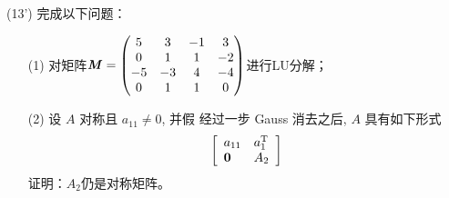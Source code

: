 \documentclass[12pt,a4paper,openany,twoside]{ctexbook}
\begin{document}
\begin{exercise}(13')
	完成以下问题：
	
	\begin{itemize}
		\item [(1)]  对矩阵$\boldsymbol{\mathit{M}} = \begin{pmatrix}
			5& 3& -1&  3\\
			0& 1&  1& -2\\
			-5& -3&  4& -4\\
			0&  1&  1&  0\\
		\end{pmatrix}$进行LU分解；
		\item [(2)] 设 $A$ 对称且 $a_{11} \neq 0$, 并假 经过一步 Gauss 消去之后, $A$ 具有如下形式
		$$
		\left[\begin{array}{ll}
			a_{11} & a_1^{\mathrm{T}} \\
			\boldsymbol{0} & A_2
		\end{array}\right]
		$$
		证明：$A_2$仍是对称矩阵。
	\end{itemize}
	
\end{exercise}
\end{document}
